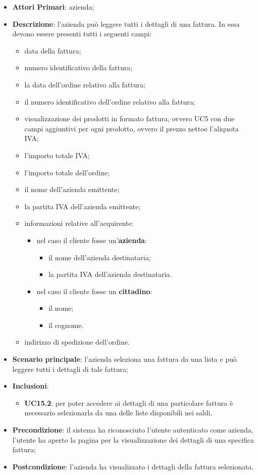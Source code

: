 \begin{itemize}
	\item \textbf{Attori Primari}: azienda;
	\item \textbf{Descrizione}: l'azienda può leggere tutti i dettagli di una fattura. In essa devono essere presenti tutti i seguenti campi:
	\begin{itemize}
		\item data della fattura;
		\item numero identificativo della fattura;
		\item la data dell'ordine relativo alla fattura;
		\item il numero identificativo dell'ordine relativo alla fattura;
		\item visualizzazione dei prodotti in formato fattura, ovvero UC5 con due campi aggiuntivi per ogni prodotto, ovvero il prezzo netto\glosp e l'aliquota IVA;
		\item l'importo totale IVA;
		\item l'importo totale dell'ordine;
		\item il nome dell'azienda emittente;
		\item la partita IVA dell'azienda emittente;
		\item informazioni relative all'acquirente:
		\begin{itemize}
			\item nel caso il cliente fosse un'\textbf{azienda}:
			\begin{itemize}
				\item il nome dell'azienda destinataria;
				\item la partita IVA dell'azienda destinataria.
			\end{itemize}
			\item nel caso il cliente fosse un \textbf{cittadino}:
			\begin{itemize}
				\item il nome;
				\item il cognome.
			\end{itemize}
		\end{itemize}
		
		\item indirizzo di spedizione dell'ordine.
	\end{itemize}
	\item \textbf{Scenario principale}: l'azienda seleziona una fattura da una lista e può leggere tutti i dettagli di tale fattura;
	\item \textbf{Inclusioni}:
	\begin{itemize}
		\item \textbf{UC15.2}: per poter accedere ai dettagli di una particolare fattura è necessario selezionarla da una delle liste disponibili nei saldi.
	\end{itemize}
	\item \textbf{Precondizione}: il sistema ha riconosciuto l'utente autenticato come azienda, l'utente ha aperto la pagina per la  visualizzazione dei dettagli di una specifica fattura;
	\item \textbf{Postcondizione}: l'azienda ha visualizzato i dettagli della fattura selezionata.
\end{itemize} 


